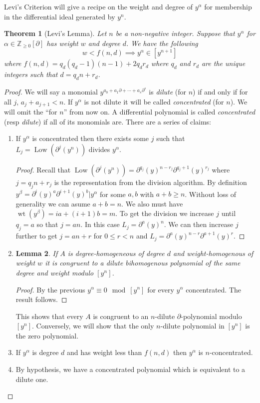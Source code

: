 \documentclass[12pt]{book}
\numberwithin{equation}{section}
\newtheorem{theorem}{Theorem}[subsection]
\newtheorem{lemma}[theorem]{Lemma}
\theoremstyle{definition}
\theoremstyle{remark}
\newcommand{\ZZ}{\mathbb{Z}}
\newcommand{\Low}{\operatorname{Low}}
\newcommand{\wt}{\operatorname{wt}}
\begin{document}
Levi's Criterion will give a recipe on the weight and degree of $y^{\alpha}$ for membership in the differential ideal generated by $y^n$.
\begin{theorem}[Levi's Lemma]\label{lem:levi}
	Let $n$ be a non-negative integer. 
	Suppose that $y^{\alpha}$ for $\alpha \in \ZZ_{\geq 0}[\partial]$ has weight $w$ and degree $d$. We have the following
	$$ w < f(n,d) \implies y^{\alpha} \in [ y^{n+1} ] $$
	where $f(n,d) = q_d(q_d-1)(n-1)+2q_dr_d$ where $q_d$ and $r_d$ are the unique integers such that $d=q_dn+r_d$.
\end{theorem}
\begin{proof}
	We will say a monomial $y^{a_0 + a_1 \partial + \cdots + a_s \partial^s}$ is \emph{dilute} (for $n$) if and only if for all $j$, $a_j + a_{j+1} < n$. 
	If $y^{\alpha}$ is not dilute it will be called \emph{concentrated} (for $n$).
	We will omit the ``for $n$'' from now on.
	A differential polynomial is called \emph{concentrated} (resp \emph{dilute}) if all of its monomials are. 
	There are a series of claims:
	\begin{enumerate}
		\item \label{L:division} If $y^{\alpha}$ is concentrated then there exists some $j$ such that $L_j=\Low(\partial^j(y^n))$ divides $y^{\alpha}$.
		\begin{proof}
			Recall that $\Low( \partial^j(y^n)) = \partial^{q_j}(y)^{n-r_j}\partial^{q_j+1}(y)^{r_j}$ where $j=q_jn+r_j$ is the representation from the division algorithm.
			By definition $y^{\beta}=\partial^i(y)^a\partial^{i+1}(y)^{b}\vert y^{\alpha}$ for some $a,b$ with $a+b\geq n$. 
			Without loss of generality we can asume $a+b=n$. 
			We also must have $\wt(y^{\beta})=ia+(i+1)b=m$.
			To get the division we increase $j$ until $q_j=a$ so that $j = an$.
			In this case $L_j = \partial^a(y)^n$.
			We can then increase $j$ further to get $j=an+r$ for $0\leq r <n$ and $L_j=\partial^a(y)^{n-r}\partial^{a+1}(y)^r$.
		\end{proof}
		\item  
		\begin{lemma}
			If $A$ is degree-homogeneous of degree $d$ and weight-homogenous of weight $w$ it is congruent to a dilute bihomogenous polynomial of the same degree and weight modulo $[y^n]$.
		\end{lemma}
		\begin{proof}
			By the previous $y^{\alpha}\equiv 0 \mod [y^n]$ for every $y^{\alpha}$ concentrated. 
			The result follows.
		\end{proof}
		This shows that every $A$ is congruent to an $n$-dilute $\partial$-polynomial modulo $[y^n]$. 
		Conversely, we will show that the only $n$-dilute polynomial in $[y^n]$ is the zero polynomial.
		\item If $y^{\alpha}$ is degree $d$ and has weight less than $f(n,d)$ then $y^{\alpha}$ is $n$-concentrated. 
		\item By hypothesis, we have a concentrated polynomial which is equivalent to a dilute one. 
	\end{enumerate}
	

\end{proof}
\end{document}
